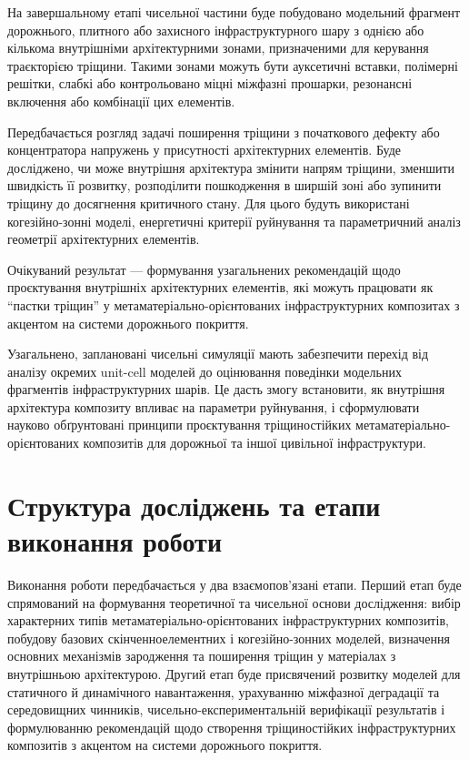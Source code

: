 \documentclass[12pt,a4paper]{article}
\begin{document}
На завершальному етапі чисельної частини буде побудовано модельний фрагмент дорожнього, плитного або захисного інфраструктурного шару з однією або кількома внутрішніми архітектурними зонами, призначеними для керування траєкторією тріщини. Такими зонами можуть бути ауксетичні вставки, полімерні решітки, слабкі або контрольовано міцні міжфазні прошарки, резонансні включення або комбінації цих елементів.

Передбачається розгляд задачі поширення тріщини з початкового дефекту або концентратора напружень у присутності архітектурних елементів. Буде досліджено, чи може внутрішня архітектура змінити напрям тріщини, зменшити швидкість її розвитку, розподілити пошкодження в ширшій зоні або зупинити тріщину до досягнення критичного стану. Для цього будуть використані когезійно-зонні моделі, енергетичні критерії руйнування та параметричний аналіз геометрії архітектурних елементів.

Очікуваний результат --- формування узагальнених рекомендацій щодо проєктування внутрішніх архітектурних елементів, які можуть працювати як ``пастки тріщин'' у метаматеріально-орієнтованих інфраструктурних композитах з акцентом на системи дорожнього покриття.

Узагальнено, заплановані чисельні симуляції мають забезпечити перехід від аналізу окремих unit-cell моделей до оцінювання поведінки модельних фрагментів інфраструктурних шарів. Це дасть змогу встановити, як внутрішня архітектура композиту впливає на параметри руйнування, і сформулювати науково обґрунтовані принципи проєктування тріщиностійких метаматеріально-орієнтованих композитів для дорожньої та іншої цивільної інфраструктури.


\section{Структура досліджень та етапи виконання роботи}

Виконання роботи передбачається у два взаємопов'язані етапи. Перший етап буде спрямований на формування теоретичної та чисельної основи дослідження: вибір характерних типів метаматеріально-орієнтованих інфраструктурних композитів, побудову базових скінченноелементних і когезійно-зонних моделей, визначення основних механізмів зародження та поширення тріщин у матеріалах з внутрішньою архітектурою. Другий етап буде присвячений розвитку моделей для статичного й динамічного навантаження, урахуванню міжфазної деградації та середовищних чинників, чисельно-експериментальній верифікації результатів і формулюванню рекомендацій щодо створення тріщиностійких інфраструктурних композитів з акцентом на системи дорожнього покриття.
\end{document}
